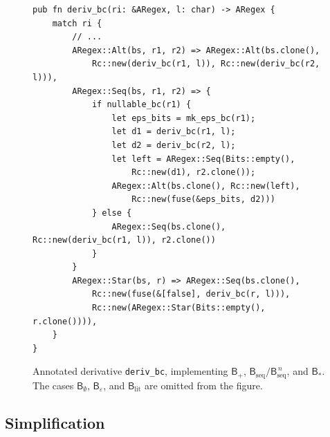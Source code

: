 \begin{figure}[H]
\small
\begin{verbatim}
pub fn deriv_bc(ri: &ARegex, l: char) -> ARegex {
    match ri {
        // ...
        ARegex::Alt(bs, r1, r2) => ARegex::Alt(bs.clone(),
            Rc::new(deriv_bc(r1, l)), Rc::new(deriv_bc(r2, l))),
        ARegex::Seq(bs, r1, r2) => {
            if nullable_bc(r1) {
                let eps_bits = mk_eps_bc(r1);
                let d1 = deriv_bc(r1, l);
                let d2 = deriv_bc(r2, l);
                let left = ARegex::Seq(Bits::empty(),
                    Rc::new(d1), r2.clone());
                ARegex::Alt(bs.clone(), Rc::new(left),
                    Rc::new(fuse(&eps_bits, d2)))
            } else {
                ARegex::Seq(bs.clone(), Rc::new(deriv_bc(r1, l)), r2.clone())
            }
        }
        ARegex::Star(bs, r) => ARegex::Seq(bs.clone(),
            Rc::new(fuse(&[false], deriv_bc(r, l))),
            Rc::new(ARegex::Star(Bits::empty(), r.clone()))),
    }
}
\end{verbatim}
\caption{Annotated derivative \texttt{deriv\_bc}, implementing
$\mathsf{B}_{+}$, $\mathsf{B}_{\mathrm{seq}}/\mathsf{B}_{\mathrm{seq}}^{\,n}$,
and $\mathsf{B}_{*}$. The cases $\mathsf{B}_{\emptyset}$,
$\mathsf{B}_{\varepsilon}$, and $\mathsf{B}_{\mathrm{lit}}$ are omitted
from the figure.}
\label{fig:derivbc-rust}
\end{figure}

%
%
%

\clearpage
\subsection{Simplification}
\label{sec:simp}


